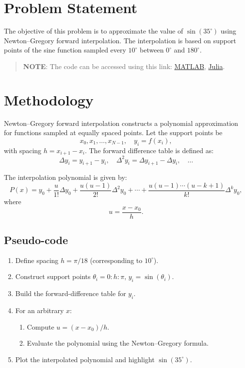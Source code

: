 \section*{Problem Statement}
The objective of this problem is to approximate the value of $\sin(35^\circ)$
using Newton–Gregory forward interpolation. The interpolation is based on support
points of the sine function sampled every $10^\circ$ between $0^\circ$ and $180^\circ$.

\begin{quote}
  \textbf{NOTE}: The code can be accessed using this link: \href{https://raw.githubusercontent.com/HavokSahil/computational-techniques-assignments/refs/heads/main/assignment4/a3.m}{MATLAB}, \href{https://raw.githubusercontent.com/HavokSahil/computational-techniques-assignments/refs/heads/main/assignment4/a3.jl}{Julia}.
\end{quote}


\section*{Methodology}
Newton–Gregory forward interpolation constructs a polynomial approximation for
functions sampled at equally spaced points. Let the support points be
\[
x_0, x_1, \dots, x_{N-1}, \quad y_i = f(x_i),
\]
with spacing $h = x_{i+1} - x_i$. The forward difference table is defined as:
\[
\Delta y_i = y_{i+1} - y_i, \quad
\Delta^2 y_i = \Delta y_{i+1} - \Delta y_i, \quad \dots
\]

The interpolation polynomial is given by:
\[
P(x) = y_0 + \frac{u}{1!}\Delta y_0 + \frac{u(u-1)}{2!}\Delta^2 y_0
       + \cdots + \frac{u(u-1)\cdots(u-k+1)}{k!}\Delta^k y_0,
\]
where
\[
u = \frac{x - x_0}{h}.
\]

\subsection*{Pseudo-code}
\begin{enumerate}
  \item Define spacing $h = \pi/18$ (corresponding to $10^\circ$).
  \item Construct support points $\theta_i = 0:h:\pi$, $y_i = \sin(\theta_i)$.
  \item Build the forward-difference table for $y_i$.
  \item For an arbitrary $x$:
  \begin{enumerate}
    \item Compute $u = (x-x_0)/h$.
    \item Evaluate the polynomial using the Newton–Gregory formula.
  \end{enumerate}
  \item Plot the interpolated polynomial and highlight $\sin(35^\circ)$.
\end{enumerate}

